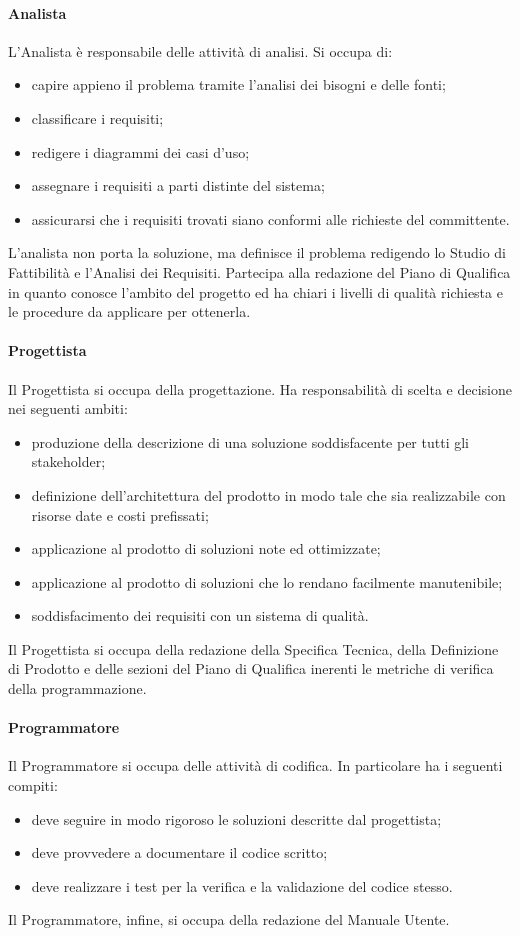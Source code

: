 			\paragraph{Analista}
				L'Analista è responsabile delle attività di analisi. Si occupa di:
				\begin{itemize}
					\item capire appieno il problema tramite l'analisi dei bisogni e delle fonti;
					\item classificare i requisiti;
					\item redigere i diagrammi dei casi d'uso;
					\item assegnare i requisiti a parti distinte del sistema;
					\item assicurarsi che i requisiti trovati siano conformi alle richieste del committente.
				\end{itemize}
				L'analista non porta la soluzione, ma definisce il problema redigendo lo Studio di Fattibilità e l'Analisi dei Requisiti. Partecipa alla redazione del Piano di Qualifica in quanto conosce l’ambito del progetto ed ha chiari i livelli di qualità richiesta e le procedure da applicare per ottenerla.
			\paragraph{Progettista}
				Il Progettista si occupa della progettazione. Ha responsabilità di scelta e decisione nei seguenti ambiti:
				\begin{itemize}
					\item produzione della descrizione di una soluzione soddisfacente per tutti gli stakeholder;
					\item definizione dell'architettura del prodotto in modo tale che sia realizzabile con risorse date e costi prefissati;
					\item applicazione al prodotto di soluzioni note ed ottimizzate;
					\item applicazione al prodotto di soluzioni che lo rendano facilmente manutenibile;
					\item soddisfacimento dei requisiti con un sistema di qualità.
				\end{itemize}
				Il Progettista si occupa della redazione della Specifica Tecnica, della Definizione di Prodotto e delle sezioni del Piano di Qualifica inerenti le metriche di verifica della programmazione.
			\paragraph{Programmatore}
				Il Programmatore si occupa delle attività di codifica. In particolare ha i seguenti compiti:
				\begin{itemize}
					\item deve seguire in modo rigoroso le soluzioni descritte dal progettista;
					\item deve provvedere a documentare il codice scritto;
					\item deve realizzare i test per la verifica e la validazione del codice stesso.
				\end{itemize}
				Il Programmatore, infine, si occupa della redazione del Manuale Utente.
